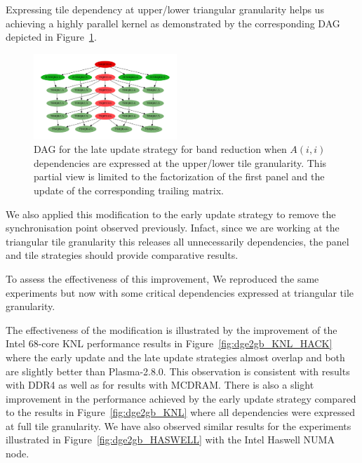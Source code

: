 Expressing tile dependency at upper/lower triangular
granularity helps us achieving a highly parallel kernel as
demonstrated by the corresponding DAG depicted in Figure~\ref{fig:dag_hack}.
\begin{figure}
  \begin{center}
    \includegraphics[width=0.48\textwidth]{fig/dag_better}
  \end{center}
  \caption{DAG for the late update strategy for band reduction when
      $A(i,i)$ dependencies are expressed at the upper/lower tile
      granularity. This partial view is limited to the factorization of the
      first panel and the update of the corresponding trailing matrix.}
  \label{fig:dag_hack}
\end{figure}

We also applied this modification to the early update strategy
to remove the synchronisation point observed previously.
Infact, since we are working at the triangular tile granularity this
releases all unnecessarily dependencies,
the panel and tile strategies should provide comparative results.

To assess the effectiveness of this improvement,
We reproduced the same experiments but now with
some critical dependencies expressed at triangular
tile granularity.

The effectiveness of the modification is illustrated by
the improvement of the Intel 68-core KNL performance
results in Figure~\ref{fig:dge2gb_KNL_HACK} where
the early update and the late update strategies
almost overlap and both are slightly better than Plasma-2.8.0.
This observation is consistent with results with DDR4 as well as
for results with MCDRAM.
There is also a slight improvement in the
performance achieved by the early update strategy
compared to the results in Figure~\ref{fig:dge2gb_KNL} where all dependencies
were expressed at full tile granularity.
We have also observed similar results for the experiments
illustrated in Figure~\ref{fig:dge2gb_HASWELL} with the Intel Haswell NUMA node.



